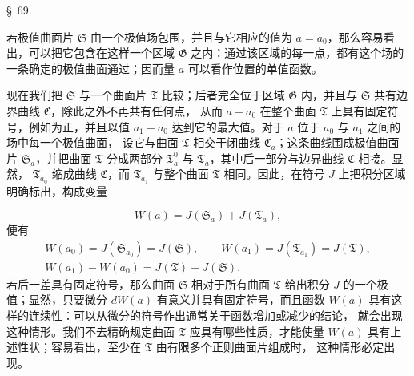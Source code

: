 \documentclass[11pt,a4paper,leqno]{article}
\begin{document}
\begin{center}
{\large \S~69.}
\end{center}

若极值曲面片 $\mathfrak{S}$ 由一个极值场包围，并且与它相应的值为
$a=a_0$，那么容易看出，可以把它包含在这样一个区域 $\mathfrak{G}$
之内：通过该区域的每一点，都有这个场的一条确定的极值曲面通过；因而量 $a$
可以看作位置的单值函数。

现在我们把 $\mathfrak{S}$ 与一个曲面片 $\mathfrak{T}$ 比较；后者完全位于区域
$\mathfrak{G}$ 内，并且与 $\mathfrak{S}$ 共有边界曲线 $\mathfrak{C}$，除此之外不再共有任何点，
从而 $a-a_0$ 在整个曲面 $\mathfrak{T}$ 上具有固定符号，例如为正，并且以值
$a_1-a_0$ 达到它的最大值。对于 $a$ 位于 $a_0$ 与 $a_1$ 之间的场中每一个极值曲面，
设它与曲面 $\mathfrak{T}$ 相交于闭曲线 $\mathfrak{C}_a$；这条曲线围成极值曲面片
$\mathfrak{S}_a$，并把曲面 $\mathfrak{T}$ 分成两部分 $\mathfrak{T}_a^0$ 与
$\mathfrak{T}_a$，其中后一部分与边界曲线 $\mathfrak{C}$ 相接。显然，
$\mathfrak{T}_{a_0}$ 缩成曲线 $\mathfrak{C}$，而 $\mathfrak{T}_{a_1}$ 与整个曲面
$\mathfrak{T}$ 相同。因此，在符号 $J$ 上把积分区域明确标出，构成变量

\[
W(a)=J(\mathfrak{S}_a)+J(\mathfrak{T}_a),
\]
便有
\[
\begin{gathered}
W(a_0)=J(\mathfrak{S}_{a_0})=J(\mathfrak{S}),\qquad
W(a_1)=J(\mathfrak{T}_{a_1})=J(\mathfrak{T}),\\
W(a_1)-W(a_0)=J(\mathfrak{T})-J(\mathfrak{S}).
\end{gathered}
\]
若后一差具有固定符号，那么曲面 $\mathfrak{S}$ 相对于所有曲面 $\mathfrak{T}$
给出积分 $J$ 的一个极值；显然，只要微分 $dW(a)$ 有意义并具有固定符号，而且函数
$W(a)$ 具有这样的连续性：可以从微分的符号作出通常关于函数增加或减少的结论，
就会出现这种情形。我们不去精确规定曲面 $\mathfrak{T}$ 应具有哪些性质，才能使量
$W(a)$ 具有上述性状；容易看出，至少在 $\mathfrak{T}$ 由有限多个正则曲面片组成时，
这种情形必定出现。
\end{document}

